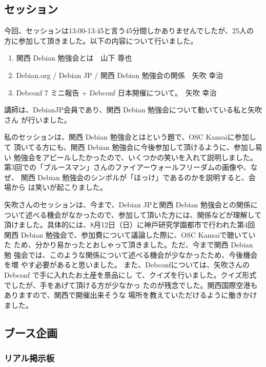 \documentclass[mingoth,a4paper]{jsarticle}
\begin{document}
\subsection{セッション}

今回、セッションは13:00-13:45と言う45分間しかありませんでしたが、25人の
方に参加して頂きました。以下の内容について行いました。

\begin{enumerate}
 \item 関西 Debian 勉強会とは　山下 尊也
 \item Debian.org / Debian JP / 関西 Debian 勉強会の関係　矢吹 幸治
 \item Debconf 7 ミニ報告 + Debconf 日本開催について。　矢吹 幸治
\end{enumerate}

講師は、DebianJP会員であり、関西 Debian 勉強会について動いている私と矢吹さん
が行いました。

私のセッションは、関西 Debian 勉強会とはという題で、OSC Kansaiに参加して
頂いてる方にも、関西 Debian 勉強会に今後参加して頂けるように、参加し易い
勉強会をアピールしたかったので、いくつかの笑いを入れて説明しました。
第3回での「ブルースマン」さんのファイアーウォールフリーダムの画像や、なぜ、
関西 Debian 勉強会のシンボルが「ほっけ」であるのかを説明すると、会場から
は笑いが起こりました。

矢吹さんのセッションは、今まで、Debian JPと関西 Debian 勉強会との関係に
ついて述べる機会がなかったので、参加して頂いた方には、関係などが理解して
頂けました。具体的には、8月12日（日）に神戸研究学園都市で行われた第4回
関西 Debian 勉強会で、参加費について議論した際に、OSC Kansaiで聴いていた
ため、分かり易かったとおしゃって頂きました。ただ、今まで関西 Debian 勉
強会では、このような関係について述べる機会が少なかったため、今後機会を増
やす必要があると思いました。
また、Debconfについては、矢吹さんの Debconf で手に入れたお土産を景品にし
て、クイズを行いました。クイズ形式でしたが、手をあげて頂ける方が少なかっ
たのが残念でした。関西国際空港もありますので、関西で開催出来そうな
場所を教えていただけるように働きかけました。

\subsection{ブース企画}

\subsubsection{リアル掲示板}
\end{document}
